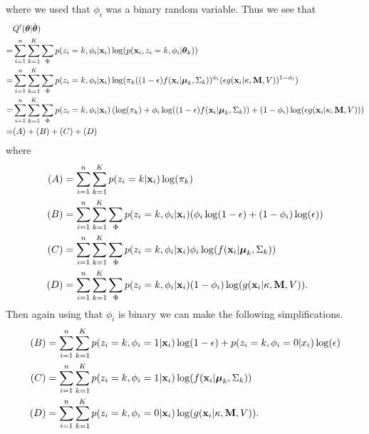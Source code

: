 \documentclass[12pt,english]{article}
\begin{document}
where we used that $\phi_i$ was a binary random variable. Thus we see that
\begin{equation}
\begin{split}
&Q'(\boldsymbol{\theta}| \hat{\boldsymbol{\theta}}) \\
 = & \sum_{i=1}^{n} \sum_{k=1}^{K}\sum_{\Phi}p(z_i = k, \phi_i|{\bf x}_i) \log(p({\bf x}_i, z_i = k , \phi_i|\boldsymbol{\theta}_k)) \\
= & \sum_{i=1}^{n} \sum_{k=1}^{K}\sum_{\Phi}p(z_i = k, \phi_i|{\bf x}_i) \log(\pi_k ((1 - \epsilon)f({\bf x}_i|\boldsymbol{\mu}_k, \Sigma_k))^{\phi_i}(\epsilon g({\bf x}_i|\kappa, {\bf M}, V))^{1-\phi_i})  \\
= & \sum_{i=1}^{n} \sum_{k=1}^{K}\sum_{\Phi}p(z_i = k, \phi_i|{\bf x}_i)\left( \log(\pi_k)  + \phi_i\log((1 - \epsilon)f({\bf x}_i|\boldsymbol{\mu}_k, \Sigma_k)) + (1-\phi_i)\log(\epsilon g({\bf x}_i|\kappa, {\bf M}, V))\right)  \\
= & (A) + (B) + (C) + (D)
\end{split}
\end{equation}
where
\begin{equation}
\begin{split}
(A) &= \sum_{i=1}^{n} \sum_{k=1}^{K}p(z_i = k|{\bf x}_i)\log(\pi_k) \\
(B) & = \sum_{i=1}^{n} \sum_{k=1}^{K}\sum_{\Phi}p(z_i = k, \phi_i|{\bf x}_i)(\phi_i\log(1 - \epsilon) + (1-\phi_i)\log(\epsilon))\\
(C) & = \sum_{i=1}^{n} \sum_{k=1}^{K}\sum_{\Phi}p(z_i = k, \phi_i|{\bf x}_i)\phi_i \log (f({\bf x}_i|\boldsymbol{\mu}_k, \Sigma_k))\\
(D)& = \sum_{i=1}^{n} \sum_{k=1}^{K}\sum_{\Phi}p(z_i = k, \phi_i|{\bf x}_i)(1-\phi_i)\log( g({\bf x}_i|\kappa, {\bf M}, V)).\\
\end{split}
\end{equation}
Then again using that $\phi_i$ is binary we can make the following simplifications.
\begin{equation}\label{equation::q}
\begin{split}
(B) & = \sum_{i=1}^{n} \sum_{k=1}^{K}p(z_i = k, \phi_i = 1|{\bf x}_i)\log(1 - \epsilon) + p(z_i = k, \phi_i = 0|x_i)\log(\epsilon)\\
(C) & = \sum_{i=1}^{n} \sum_{k=1}^{K}p(z_i = k, \phi_i = 1|{\bf x}_i)\log (f({\bf x}_i|\boldsymbol{\mu}_k, \Sigma_k))\\
(D)& = \sum_{i=1}^{n} \sum_{k=1}^{K}p(z_i = k, \phi_i = 0 |{\bf x}_i)\log( g({\bf x}_i|\kappa, {\bf M}, V)).\\
\end{split}
\end{equation}
\end{document}
